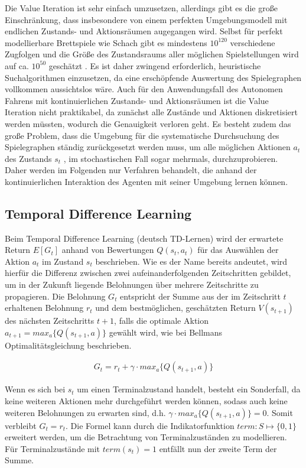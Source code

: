 Die Value Iteration ist sehr einfach umzusetzen, allerdings gibt es die große
Einschränkung, dass insbesondere von einem perfekten Umgebungsmodell mit endlichen
Zustands- und Aktionsräumen augegangen wird. Selbst für perfekt modellierbare Brettspiele
wie Schach gibt es mindestens $10^{120}$ verschiedene Zugfolgen und die Größe des
Zustandsraums aller möglichen Spielstellungen wird auf ca. $10^{50}$ geschätzt
\cite{Shannon1988}. Es ist daher zwingend erforderlich, heuristische Suchalgorithmen
einzusetzen, da eine erschöpfende Auswertung des Spielegraphen vollkommen
aussichtslos wäre.
Auch für den Anwendungsfall des Autonomen Fahrens mit kontinuierlichen Zustands- und
Aktionsräumen ist die Value Iteration nicht praktikabel, da zunächst alle Zustände
und Aktionen diskretisiert werden müssten, wodurch die Genauigkeit verloren geht.
Es besteht zudem das große Problem, dass die Umgebung für
die systematische Durchsuchung des Spielegraphen ständig zurückgesetzt werden muss,
um alle möglichen Aktionen $a_t$ des Zustands $s_t$ , im stochastischen Fall
sogar mehrmals, durchzuprobieren. Daher werden im Folgenden nur Verfahren behandelt,
die anhand der kontinuierlichen Interaktion des Agenten mit seiner Umgebung
lernen können.

\subsection{Temporal Difference Learning}
Beim Temporal Difference Learning (deutsch TD-Lernen) wird der erwartete Return $E[G_t]$
anhand von Bewertungen $Q(s_t, a_t)$ für das Auswählen der Aktion $a_t$ im Zustand $s_t$
beschrieben. Wie es der Name bereits andeutet, wird hierfür die Differenz zwischen zwei
aufeinanderfolgenden Zeitschritten gebildet, um in der Zukunft liegende Belohnungen
über mehrere Zeitschritte zu propagieren. Die Belohnung $G_t$ entspricht der Summe aus der
im Zeitschritt $t$ erhaltenen Belohnung $r_t$ und dem bestmöglichen, geschätzten Return
$V(s_{t+1})$ des nächsten Zeitschritts $t+1$, falls die optimale Aktion
$a_{t+1} = max_a \{ Q(s_{t+1}, a) \}$ gewählt wird, wie bei Bellmans Optimalitätsgleichung
beschrieben.

\begin{equation}
\begin{aligned}
G_t = r_t + \gamma \cdot max_a \{ Q(s_{t+1}, a) \}
\end{aligned}
\end{equation}

Wenn es sich bei $s_t$ um einen Terminalzustand handelt, besteht ein Sonderfall,
da keine weiteren Aktionen mehr durchgeführt werden können, sodass auch keine weiteren
Belohnungen zu erwarten sind, d.h. $\gamma \cdot max_a \{ Q(s_{t+1}, a) \} = 0$.
Somit verbleibt $G_t = r_t$.
Die Formel kann durch die Indikatorfunktion $term: S \mapsto \{0, 1\}$ erweitert
werden, um die Betrachtung von Terminalzuständen zu modellieren. Für Terminalzustände
mit $term(s_t) = 1$ entfällt nun der zweite Term der Summe.

